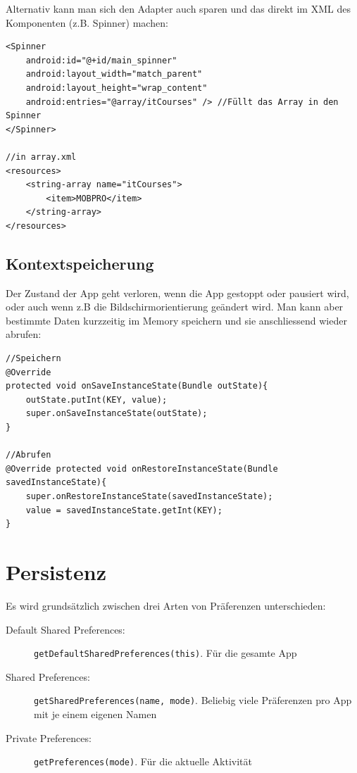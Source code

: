 \documentclass[a4paper, 11pt]{article}
\newcommand{\code}[1]{\texttt{#1}}
\begin{document}
Alternativ kann man sich den Adapter auch sparen und das direkt im XML des Komponenten (z.B. Spinner) machen:

\begin{lstlisting}[caption={Spinner-Layout mit direkten Füllen}]
<Spinner
	android:id="@+id/main_spinner"
	android:layout_width="match_parent"
	android:layout_height="wrap_content"
	android:entries="@array/itCourses" /> //Füllt das Array in den Spinner
</Spinner>

//in array.xml
<resources>
	<string-array name="itCourses">	
		<item>MOBPRO</item>
	</string-array>
</resources>
\end{lstlisting}

\subsection{Kontextspeicherung}
Der Zustand der App geht verloren, wenn die App gestoppt oder pausiert wird, oder auch wenn  z.B die Bildschirmorientierung geändert wird. Man kann aber bestimmte Daten kurzzeitig im Memory speichern und sie anschliessend wieder abrufen:

\begin{lstlisting}[caption={Abspeichern und Abrufen von Values im Memory}]
//Speichern
@Override
protected void onSaveInstanceState(Bundle outState){
	outState.putInt(KEY, value);
	super.onSaveInstanceState(outState);
}

//Abrufen
@Override protected void onRestoreInstanceState(Bundle savedInstanceState){
	super.onRestoreInstanceState(savedInstanceState);
	value = savedInstanceState.getInt(KEY);
}
\end{lstlisting}

\section{Persistenz}
Es wird grundsätzlich zwischen drei Arten von Präferenzen unterschieden:

\begin{description}
	\item[Default Shared Preferences: ] \code{getDefaultSharedPreferences(this)}. Für die gesamte App
	\item[Shared Preferences: ] \code{getSharedPreferences(name, mode)}. Beliebig viele Präferenzen pro App mit je einem eigenen Namen
	\item[Private Preferences: ] \code{getPreferences(mode)}. Für die aktuelle Aktivität
\end{description}
\end{document}
